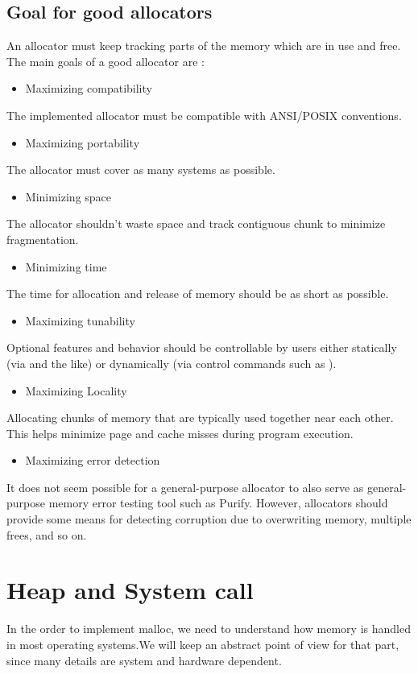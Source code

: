 \subsection{Goal for good allocators}
An allocator must keep tracking parts of the memory which are in use and free.
The main goals of a good allocator are \cite{Lea12}:
\begin{itemize}
\item Maximizing compatibility
\end{itemize}
The implemented allocator must be compatible with ANSI/POSIX conventions.

\begin{itemize}
\item Maximizing portability
\end{itemize}
The allocator must cover as many systems as possible.
\begin{itemize}
\item Minimizing space
\end{itemize}
The allocator shouldn't waste space and track contiguous chunk to minimize fragmentation.

\begin{itemize}
\item Minimizing time
\end{itemize}
The time for allocation and release of memory should be as short as possible.

\begin{itemize}
\item Maximizing tunability
\end{itemize}
Optional features and behavior should be controllable by users either statically (via  and the like) or dynamically (via control commands such as ).
\begin{itemize}
\item Maximizing Locality
\end{itemize}
Allocating chunks of memory that are typically used together near each other. This helps minimize page and cache misses during program execution.
\begin{itemize}
\item Maximizing error detection
\end{itemize}
It does not seem possible for a general-purpose allocator to also serve as general-purpose memory error testing tool such as Purify. However, allocators should provide some means for detecting corruption due to overwriting memory, multiple frees, and so on.
\section{Heap and System call}
In the order to implement malloc, we need to understand how memory is handled in most operating systems.We will keep an abstract point of view for that part, since many details are system and
hardware dependent.

